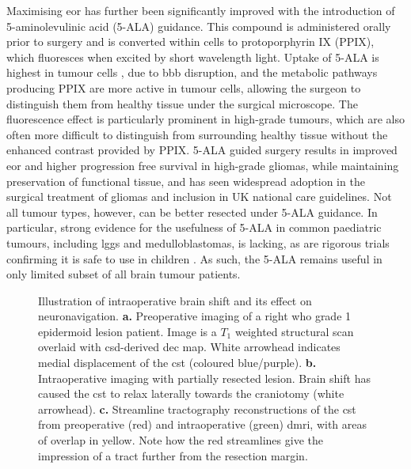 \documentclass[12pt,phd,a4paper,twoside]{ucl_thesis}
\providecommand{\DIFaddtex}[1]{{\protect\color{blue} \sf #1}} %
\providecommand{\DIFaddbegin}{} %
\providecommand{\DIFaddend}{} %
\providecommand{\DIFadd}[1]{\texorpdfstring{\DIFaddtex{#1}}{#1}} %
\newcommand{\DIFaddincludegraphics}[2][]{{\color{blue}\fbox{\DIFOincludegraphics[#1]{#2}}}} %
\DeclareRobustCommand{\DIFaddbegin}{\DIFOaddbegin \let\includegraphics\DIFaddincludegraphics} %
\DeclareRobustCommand{\DIFaddend}{\DIFOaddend \let\includegraphics\DIFOincludegraphics} %
\begin{document}
Maximising \gls{eor} has further been significantly improved with the introduction of 5-aminolevulinic acid (5-ALA) guidance.
This compound is administered orally prior to surgery and is converted within cells to protoporphyrin IX (PPIX), which fluoresces when excited by short wavelength light.
Uptake of 5-ALA is highest in tumour cells\DIFaddbegin \DIFadd{, }\DIFaddend due to \gls{bbb} disruption, and the metabolic pathways producing PPIX are more active in tumour cells, allowing the surgeon to distinguish them from healthy tissue under the surgical microscope.
\DIFaddbegin \DIFadd{The fluorescence effect is particularly prominent in high-grade tumours, which are also often more difficult to distinguish from surrounding healthy tissue without the enhanced contrast provided by PPIX.
}\DIFaddend 5-ALA guided surgery results in improved \gls{eor} and higher progression free survival \DIFaddbegin \DIFadd{in high-grade gliomas}\DIFaddend , while maintaining preservation of functional tissue\autocite{Coburger2019,Golub2020}, and has seen widespread adoption in the surgical treatment of gliomas\autocite{Stummer2006} and inclusion in UK national care guidelines\autocite{NICE2021}.
\DIFaddbegin \DIFadd{Not all tumour types, however, can be better resected under 5-ALA guidance.
In particular, strong evidence for the usefulness of 5-ALA in common paediatric tumours, including }\glspl{lgg} \DIFadd{and medulloblastomas, is lacking, as are rigorous trials confirming it is safe to use in children}\autocite{Schwake2019}\DIFadd{.
As such, the 5-ALA remains useful in only limited subset of all brain tumour patients.
}\DIFaddend 

\begin{SCfigure}[][hp!]
  
  \caption[Intraoperative brain shift]{Illustration of intraoperative brain shift and its effect on neuronavigation.
  \textbf{\sffamily a.} Preoperative imaging of a right \gls{who} grade 1 epidermoid lesion patient. Image is a $T_1$ weighted structural scan overlaid with \gls{csd}-derived \gls{dec} map. White arrowhead indicates medial displacement of the \gls{cst} (coloured blue/purple).
  \textbf{\sffamily b.} Intraoperative imaging with partially resected lesion. Brain shift has caused the \gls{cst} to relax laterally towards the craniotomy (white arrowhead).
  \textbf{\sffamily c.} Streamline tractography reconstructions of the \gls{cst} from preoperative (red) and intraoperative (green) \gls{dmri}, with areas of overlap in yellow. Note how the red streamlines give the impression of a tract further from the resection margin.}
  \label{fig:shift}
\end{SCfigure}
\end{document}
